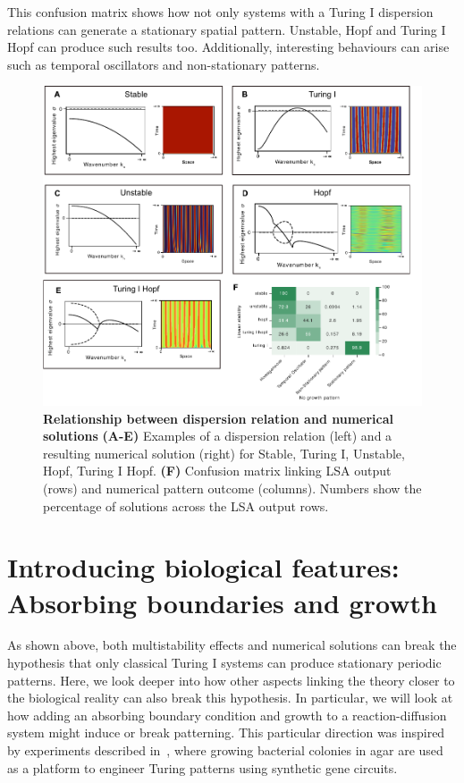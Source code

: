 This confusion matrix shows how not only systems with a Turing I dispersion relations can generate a stationary spatial pattern. Unstable, Hopf and Turing I Hopf can produce such results too. Additionally, interesting behaviours can arise such as temporal oscillators and non-stationary patterns.

\begin{figure}[H]
    \includegraphics[width=1\textwidth]{figures/dispersion} %
    \caption{\textbf{Relationship between dispersion relation and numerical solutions} \textbf{(A-E)} Examples of a dispersion relation (left) and a resulting numerical solution (right) for Stable, Turing I, Unstable, Hopf, Turing I Hopf. \textbf{(F)} Confusion matrix linking LSA output (rows) and numerical pattern outcome (columns). Numbers show the percentage of solutions across the LSA output rows.}
    \label{fig:dispersions} %
\end{figure}


\section{Introducing biological features: Absorbing boundaries and growth}
As shown above, both multistability effects and numerical solutions can break the hypothesis that only classical Turing I systems can produce stationary periodic patterns.
Here, we look deeper into how other aspects linking the theory closer to the biological reality can also break this hypothesis.
In particular, we will look at how adding an absorbing boundary condition and growth to a reaction-diffusion system might induce or break patterning.
This particular direction was inspired by experiments described in~\parencite{Oliver2023}, where growing bacterial colonies in agar are used as a platform to engineer Turing patterns using synthetic gene circuits.

